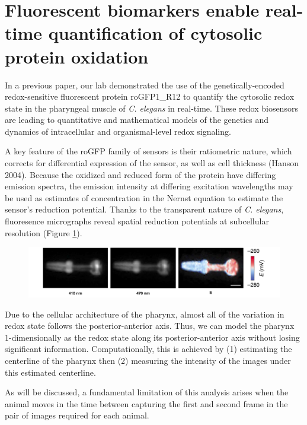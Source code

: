 \section{Fluorescent biomarkers enable real-time quantification of cytosolic protein oxidation} \label{fluorescenceIntro}
In a previous paper, our lab demonstrated the use of the genetically-encoded redox-sensitive fluorescent protein roGFP1\_R12 to quantify the cytosolic redox state in the pharyngeal muscle of \textit{C. elegans} in real-time. These redox biosensors are leading to quantitative and mathematical models of the genetics and dynamics of intracellular and organismal-level redox signaling.

A key feature of the roGFP family of sensors is their ratiometric nature, which corrects for differential expression of the sensor, as well as cell thickness (Hanson 2004). Because the oxidized and reduced form of the protein have differing emission spectra, the emission intensity at differing excitation wavelengths may be used as estimates of concentration in the Nernst equation to estimate the sensor's reduction potential. Thanks to the transparent nature of \textit{C. elegans}, fluoresence micrographs reveal spatial reduction potentials at subcellular resolution (Figure \ref{fig:ratioImageToE}).

\begin{figure}[ht]
    \centering
    \includegraphics[scale=.25]{Figures/rendered_files/ratios_to_e}
    \decoRule
    \caption[Ratios of images to redox state]{}
    \label{fig:ratioImageToE}
\end{figure}

Due to the cellular architecture of the pharynx, almost all of the variation in redox state follows the posterior-anterior axis. Thus, we can model the pharynx 1-dimensionally as the redox state along its posterior-anterior axis without losing significant information. Computationally, this is achieved by (1) estimating the centerline of the pharynx then (2) measuring the intensity of the images under this estimated centerline.

As will be discussed, a fundamental limitation of this analysis arises when the animal moves in the time between capturing the first and second frame in the pair of images required for each animal. 

